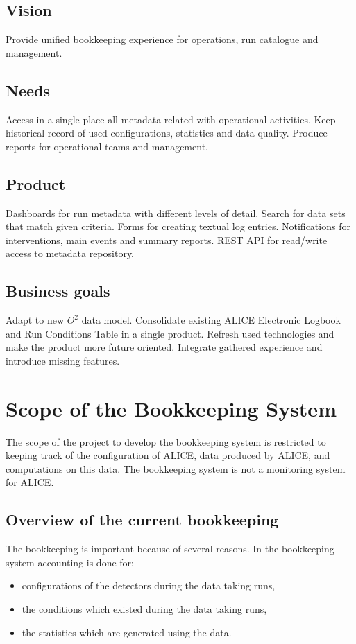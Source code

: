 \subsection{Vision}
Provide unified bookkeeping experience for operations, run catalogue and management.

\subsection{Needs}
Access in a single place all metadata related with operational activities. Keep historical record of used configurations, statistics and data quality. Produce reports for operational teams and management. 

\subsection{Product}
Dashboards for run metadata with different levels of detail. Search for data sets that match given criteria. Forms for creating textual log entries. Notifications for interventions, main events and summary reports. REST API for read/write access to metadata repository. 


\subsection{Business goals}
Adapt to new $O^2$ data model. Consolidate existing ALICE Electronic Logbook and Run Conditions Table in a single product. Refresh used technologies and make the product more future oriented. Integrate gathered experience and introduce missing features. 



\section{Scope of the Bookkeeping System}
The scope of the project to develop the bookkeeping system is restricted to keeping track of the configuration of ALICE, data produced by ALICE, and computations on this data. The bookkeeping system is not a monitoring system for ALICE.


\subsection{Overview of the current bookkeeping}

The bookkeeping is important because of several reasons. In the bookkeeping system accounting is done for:
\begin{itemize}
  \item configurations of the detectors during the data taking runs,
  \item the conditions which existed during the data taking runs,
  \item the statistics which are generated using the data.
\end{itemize}

